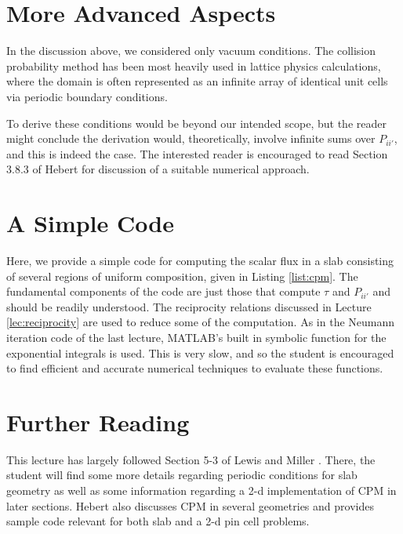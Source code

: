 \section*{More Advanced Aspects}

In the discussion above, we considered only vacuum conditions.  The collision probability method has been most heavily used in lattice physics calculations, where the domain is often represented as an infinite array of identical unit cells via periodic boundary conditions.  

To derive these conditions would be beyond our intended scope, but the reader might conclude the derivation would, theoretically, involve infinite sums over $P_{ii'}$, and this is indeed the case.  The interested reader is encouraged to read Section 3.8.3 of Hebert \cite{hebert2009arp} for discussion of a suitable numerical approach.

\section*{A Simple Code}

Here, we provide a simple code for computing the scalar flux in a slab consisting of several regions of uniform composition, given in Listing \ref{list:cpm}.  The fundamental components of the code are just those that compute $\tau$ and $P_{ii'}$ and should be readily understood.  The reciprocity relations discussed in Lecture \ref{lec:reciprocity} are used to reduce some of the computation.  As in the Neumann iteration code of the last lecture, MATLAB's built in symbolic function for the exponential integrals is used.  This is very slow, and so the student is encouraged to find efficient and accurate numerical techniques to evaluate these functions.  



\section*{Further Reading}

This lecture has largely followed Section 5-3 of Lewis and Miller \cite{lewis1993cmn}.  There, the student will find some more details regarding periodic conditions for slab geometry as well as some information regarding a 2-d implementation of CPM in later sections.  Hebert \cite{hebert2009arp} also discusses CPM in several geometries and provides sample code relevant for both slab and a 2-d pin cell problems.

